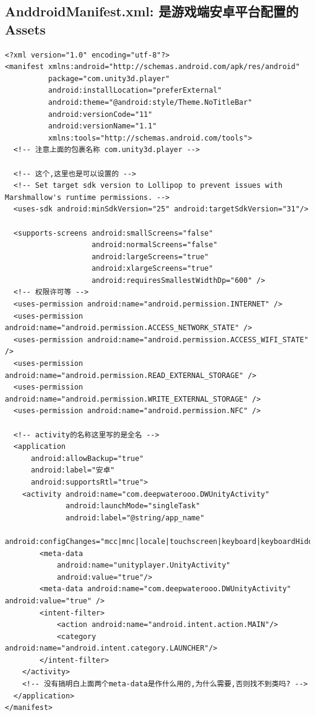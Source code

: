 \documentclass[9pt, b5paper]{article}
\begin{document}
\subsection{AnddroidManifest.xml: 是游戏端安卓平台配置的Assets\Plugins\Android}
\label{sec-1-8}
\begin{verbatim}
<?xml version="1.0" encoding="utf-8"?>
<manifest xmlns:android="http://schemas.android.com/apk/res/android"
          package="com.unity3d.player"
          android:installLocation="preferExternal"
          android:theme="@android:style/Theme.NoTitleBar"
          android:versionCode="11"
          android:versionName="1.1"
          xmlns:tools="http://schemas.android.com/tools">
  <!-- 注意上面的包裹名称 com.unity3d.player -->

  <!-- 这个,这里也是可以设置的 -->
  <!-- Set target sdk version to Lollipop to prevent issues with Marshmallow's runtime permissions. -->
  <uses-sdk android:minSdkVersion="25" android:targetSdkVersion="31"/>

  <supports-screens android:smallScreens="false"
                    android:normalScreens="false"
                    android:largeScreens="true"
                    android:xlargeScreens="true"
                    android:requiresSmallestWidthDp="600" />
  <!-- 权限许可等 -->
  <uses-permission android:name="android.permission.INTERNET" />
  <uses-permission android:name="android.permission.ACCESS_NETWORK_STATE" />
  <uses-permission android:name="android.permission.ACCESS_WIFI_STATE" /> 
  <uses-permission android:name="android.permission.READ_EXTERNAL_STORAGE" />
  <uses-permission android:name="android.permission.WRITE_EXTERNAL_STORAGE" />
  <uses-permission android:name="android.permission.NFC" />

  <!-- activity的名称这里写的是全名 -->
  <application
      android:allowBackup="true"
      android:label="安卓"
      android:supportsRtl="true">
    <activity android:name="com.deepwaterooo.DWUnityActivity"
              android:launchMode="singleTask"
			  android:label="@string/app_name"
			  android:configChanges="mcc|mnc|locale|touchscreen|keyboard|keyboardHidden|navigation|orientation|screenLayout|uiMode|screenSize|smallestScreenSize|fontScale">
        <meta-data
            android:name="unityplayer.UnityActivity"
            android:value="true"/>
        <meta-data android:name="com.deepwaterooo.DWUnityActivity" android:value="true" />
        <intent-filter>
            <action android:name="android.intent.action.MAIN"/>
            <category android:name="android.intent.category.LAUNCHER"/>
        </intent-filter>
    </activity>
    <!-- 没有搞明白上面两个meta-data是作什么用的,为什么需要,否则找不到类吗? -->
  </application>
</manifest>
\end{verbatim}
\end{document}
